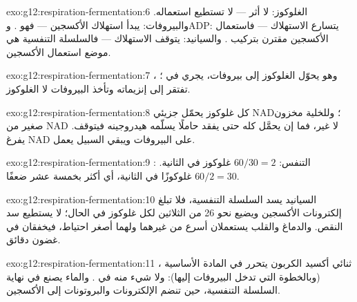 \begin{solution}{exo:g12:respiration-fermentation:6}
الغلوكوز: لا أثر ---  لا تستطيع استعماله. والبيروفات: يبدأ
استهلاك الأكسجين --- فهو  . وADP: يتسارع الاستهلاك ---
فاستعمال الأكسجين مقترن بتركيب . والسيانيد: يتوقف الاستهلاك ---
فالسلسلة التنفسية هي موضع استعمال الأكسجين.
\end{solution}

\begin{solution}{exo:g12:respiration-fermentation:7}
، وهو يحوّل الغلوكوز إلى بيروفات، يجري في ؛
 تفتقر إلى إنزيماته وتأخذ البيروفات لا الغلوكوز.
\end{solution}

\begin{solution}{exo:g12:respiration-fermentation:8}
كل غلوكوز يحمّل جزيئي NAD؛ وللخلية مخزون صغير من NAD لا غير، فما إن
يحمَّل كله حتى يفقد  حاملًا يسلّمه هيدروجينه فيتوقف. 
يفرغ NAD على البيروفات ويبقي السبيل يعمل.
\end{solution}

\begin{solution}{exo:g12:respiration-fermentation:9}
التنفس: $60/30 = 2$ غلوكوز في الثانية. : $60/2 = 30$ غلوكوزًا
في الثانية، أي أكثر بخمسة عشر ضعفًا.
\end{solution}

\begin{solution}{exo:g12:respiration-fermentation:10}
السيانيد يسد السلسلة التنفسية، فلا تبلغ إلكترونات الأكسجين ويضيع نحو
26 من الثلاثين  لكل غلوكوز في الحال؛  لا يستطيع سد النقص.
والدماغ والقلب يستعملان  أسرع من غيرهما ولهما أصغر احتياط، فيخفقان
في غضون دقائق.
\end{solution}

\begin{solution}{exo:g12:respiration-fermentation:11}
ثنائي أكسيد الكربون يتحرر في المادة الأساسية ، 
(وبالخطوة التي تدخل البيروفات إليها): ولا شيء منه في .
والماء يصنع في نهاية السلسلة التنفسية، حين تنضم الإلكترونات
والبروتونات إلى الأكسجين.
\end{solution}


